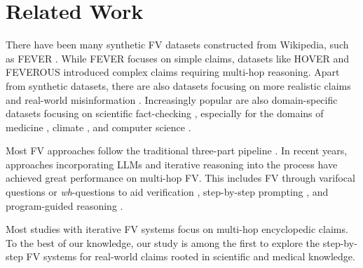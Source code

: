 \section{Related Work}
There have been many synthetic FV datasets constructed from Wikipedia, such as FEVER \cite{thorne-etal-2018-fever}. While FEVER focuses on simple claims, datasets like 
HOVER \cite{jiang-etal-2020-hover} and 
FEVEROUS \cite{aly-etal-2021-fact} introduced complex claims requiring multi-hop reasoning. Apart from synthetic datasets, there are also datasets focusing on more realistic claims and real-world misinformation \cite{schlichtkrull2023averitec, glockner-etal-2024-ambifc}. Increasingly popular are also domain-specific datasets focusing on scientific fact-checking \cite{vladika-matthes-2023-scientific}, especially for the domains of medicine \cite{saakyan-etal-2021-covid, sarrouti2021evidence}, climate \cite{diggelmann2020climatefever}, and computer science \cite{lu-etal-2023-scitab}. 

Most FV approaches follow the traditional three-part pipeline \cite{bekoulis2021review}. In recent years, approaches incorporating LLMs and iterative reasoning into the process have achieved great performance on multi-hop FV. This includes FV through varifocal questions \cite{ousidhoum-etal-2022-varifocal} or \textit{wh}-questions to aid verification \cite{rani-etal-2023-factify}, step-by-step prompting \cite{zhang-gao-2023-towards}, and program-guided reasoning \cite{pan-etal-2023-fact}.

Most studies with iterative FV systems focus on multi-hop encyclopedic claims. To the best of our knowledge, our study is among the first to explore the step-by-step FV systems for real-world claims rooted in scientific and medical knowledge.